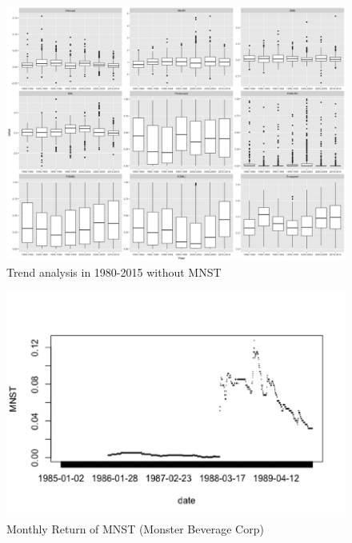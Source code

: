 \documentclass{beamer}
\begin{document}
\begin{frame}
\begin{figure}
\centering
\includegraphics[scale=.16]{3SP500-1980-2015-no-MNST.png}
\caption{Trend analysis in 1980-2015 without MNST}
\end{figure}

\end{frame}

\begin{frame}
\begin{figure}
\centering
\includegraphics[scale=.6]{weirdgraph.png}
\caption{Monthly Return of MNST (Monster Beverage Corp)}
\end{figure}

\end{frame}
\end{document}
